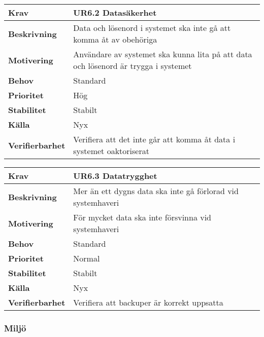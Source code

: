\documentclass[a4paper, twoside, 11pt, titlepage]{article}
\begin{document}
		\begin{tabular} { p{2.6cm} p{12.5cm} }
			\hline
			\sffamily\textbf{Krav} & \sffamily\textbf{UR6.2 Datasäkerhet } \\
			\hline
			\sffamily\textbf{Beskrivning} & Data och lösenord i systemet ska inte gå att komma åt av obehöriga  \\
			\hline
			\sffamily\textbf{Motivering} & Användare av systemet ska kunna lita på att data och lösenord är trygga i systemet  \\
			\hline
			\sffamily\textbf{Behov} & Standard  \\
			\hline
			\sffamily\textbf{Prioritet} & Hög  \\
			\hline
			\sffamily\textbf{Stabilitet} & Stabilt  \\
			\hline
			\sffamily\textbf{Källa} & Nyx  \\
			\hline
			\sffamily\textbf{Verifierbarhet} & Verifiera att det inte går att komma åt data i systemet oaktoriserat  \\
			\hline
		\end{tabular}
		\vspace{6mm}

		\begin{tabular} { p{2.6cm} p{12.5cm} }
			\hline
			\sffamily\textbf{Krav} & \sffamily\textbf{UR6.3 Datatrygghet } \\
			\hline
			\sffamily\textbf{Beskrivning} & Mer än ett dygns data ska inte gå förlorad vid systemhaveri  \\
			\hline
			\sffamily\textbf{Motivering} & För mycket data ska inte försvinna vid systemhaveri  \\
			\hline
			\sffamily\textbf{Behov} & Standard  \\
			\hline
			\sffamily\textbf{Prioritet} & Normal  \\
			\hline
			\sffamily\textbf{Stabilitet} & Stabilt  \\
			\hline
			\sffamily\textbf{Källa} & Nyx  \\
			\hline
			\sffamily\textbf{Verifierbarhet} & Verifiera att backuper är korrekt uppsatta   \\
			\hline
		\end{tabular}


		\subsubsection{Miljö}
\end{document}
